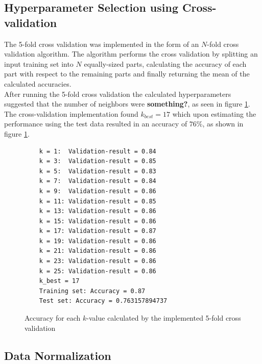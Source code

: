 \documentclass[a4paper]{article}
\begin{document}
\subsection{Hyperparameter Selection using Cross-validation}
The 5-fold cross validation was implemented in the form of an $N$-fold cross validation algorithm. The algorithm performs the cross validation by splitting an input training set into $N$ equally-sized parts, calculating the accuracy of each part with respect to the remaining parts and finally returning the mean of the calculated accuracies.\\

After running the 5-fold cross validation the calculated hyperparameters suggested that the number of neighbors were \textbf{something?}, as seen in figure \ref{fig:5-fold_results}.\\

The cross-validation implementation found $k_{best} = 17$ which upon estimating the performance using the test data resulted in an accuracy of $76\%$, as shown in figure \ref{fig:5-fold_results}. 

\begin{figure}[H]
	\begin{lstlisting}
	k = 1:  Validation-result = 0.84
	k = 3:  Validation-result = 0.85
	k = 5:  Validation-result = 0.83
	k = 7:  Validation-result = 0.84
	k = 9:  Validation-result = 0.86
	k = 11: Validation-result = 0.85
	k = 13: Validation-result = 0.86
	k = 15: Validation-result = 0.86
	k = 17: Validation-result = 0.87
	k = 19: Validation-result = 0.86
	k = 21: Validation-result = 0.86
	k = 23: Validation-result = 0.86
	k = 25: Validation-result = 0.86
	k_best = 17
	Training set: Accuracy = 0.87
	Test set: Accuracy = 0.763157894737
	\end{lstlisting}
	\caption{Accuracy for each $k$-value calculated by the implemented 5-fold cross validation}
	\label{fig:5-fold_results}
\end{figure}

\subsection{Data Normalization}
\end{document}
